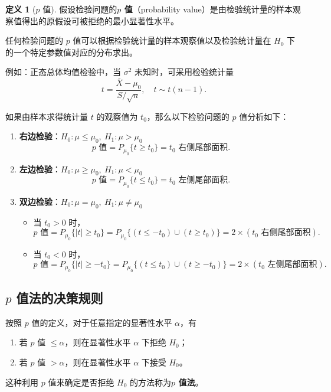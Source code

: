 \documentclass[11pt,a4paper]{report}
\theoremstyle{definition}
\newtheorem{definition}{定义}[chapter]
\begin{document}
\begin{definition}[$p$ 值]
假设检验问题的\textbf{$p$ 值}（probability value）是由检验统计量的样本观察值得出的原假设可被拒绝的最小显著性水平。

任何检验问题的 $p$ 值可以根据检验统计量的样本观察值以及检验统计量在 $H_{0}$ 下的一个特定参数值对应的分布求出。
\end{definition}

例如：正态总体均值检验中，当 $\sigma^{2}$ 未知时，可采用检验统计量
\[
t=\frac{\bar{X}-\mu_{0}}{S/\sqrt{n}},\quad t\sim t(n-1).
\]

如果由样本求得统计量 $t$ 的观察值为 $t_{0}$，那么以下检验问题的 $p$ 值分析如下：

\begin{enumerate}[label=(\arabic*)]
    \item \textbf{右边检验}：$H_{0}\colon\mu\leq\mu_{0},\ H_{1}\colon\mu>\mu_{0}$
    \[
    p\text{ 值}=P_{\mu_{0}}\{t\geq t_{0}\}=t_{0}\text{ 右侧尾部面积}.
    \]

    \item \textbf{左边检验}：$H_{0}\colon\mu\geq\mu_{0},\ H_{1}\colon\mu<\mu_{0}$
    \[
    p\text{ 值}=P_{\mu_{0}}\{t\leq t_{0}\}=t_{0}\text{ 左侧尾部面积}.
    \]

    \item \textbf{双边检验}：$H_{0}\colon\mu=\mu_{0},\ H_{1}\colon\mu\neq\mu_{0}$
    \begin{itemize}
        \item 当 $t_{0}>0$ 时，
        \[
        p\text{ 值}=P_{\mu_{0}}\{|t|\geq t_{0}\}=P_{\mu_{0}}\{(t\leq -t_{0})\cup(t\geq t_{0})\}=2\times(t_{0}\text{ 右侧尾部面积}).
        \]
        \item 当 $t_{0}<0$ 时，
        \[
        p\text{ 值}=P_{\mu_{0}}\{|t|\geq -t_{0}\}=P_{\mu_{0}}\{(t\leq t_{0})\cup(t\geq -t_{0})\}=2\times(t_{0}\text{ 左侧尾部面积}).
        \]
    \end{itemize}
\end{enumerate}

\subsection{\texorpdfstring{$p$}{p} 值法的决策规则}

按照 $p$ 值的定义，对于任意指定的显著性水平 $\alpha$，有
\begin{enumerate}[label=(\arabic*)]
    \item 若 $p$ 值 $\leq\alpha$，则在显著性水平 $\alpha$ 下拒绝 $H_{0}$；
    \item 若 $p$ 值 $>\alpha$，则在显著性水平 $\alpha$ 下接受 $H_{0}$。
\end{enumerate}
这种利用 $p$ 值来确定是否拒绝 $H_{0}$ 的方法称为\textbf{$p$ 值法}。
\end{document}
